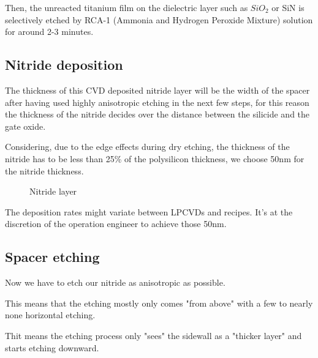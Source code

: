 Then, the unreacted titanium film on the dielectric layer such as $SiO_2$ or SiN is selectively etched by RCA-1 (Ammonia and Hydrogen Peroxide Mixture) solution for around 2-3 minutes.

\newpage

\subsection{Nitride deposition}\label{nitride_spacers_deposition}

The thickness of this CVD deposited nitride layer will be the width of the spacer after having used highly anisotropic etching in the next few steps, for this reason the thickness of the nitride decides over the distance between the silicide and the gate oxide.

Considering, due to the edge effects during dry etching, the thickness of the nitride has to be less than 25\% of the polysilicon thickness, we choose 50nm for the nitride thickness.

\begin{figure}[H]
	\centering
	\begin{tikzpicture}[node distance = 3cm, auto, thick,scale=\CrossSectionOnly, every node/.style={transform shape}]
		
	\end{tikzpicture}
	\begin{tikzpicture}[node distance = 3cm, auto, thick,scale=\CrossSectionOnly, every node/.style={transform shape}]
		
	\end{tikzpicture}
	\caption{Nitride layer}
\end{figure}

The deposition rates might variate between LPCVDs and recipes. It's at the discretion of the operation engineer to achieve those 50nm.

\subsection{Spacer etching}

Now we have to etch our nitride as anisotropic as possible.

This means that the etching mostly only comes "from above" with a few to nearly none horizontal etching.

Thit means the etching process only "sees" the sidewall as a "thicker layer" and starts etching downward.

